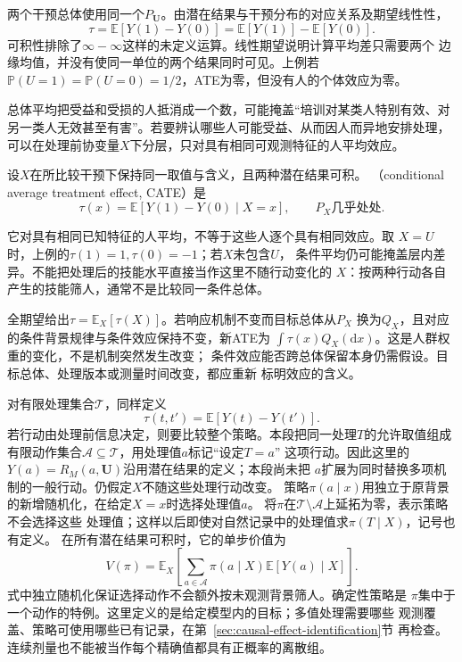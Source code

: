 两个干预总体使用同一个\(P_{\bm U}\)。由潜在结果与干预分布的对应关系及期望线性性，
\begin{equation}
  \tau
  =\mathbb E[Y(1)-Y(0)]
  =\mathbb E[Y(1)]-\mathbb E[Y(0)].
  \label{eq:causal-ate-potential-outcomes}
\end{equation}
可积性排除了\(\infty-\infty\)这样的未定义运算。线性期望说明计算平均差只需要两个
边缘均值，并没有使同一单位的两个结果同时可见。上例若
\(\mathbb P(U=1)=\mathbb P(U=0)=1/2\)，ATE为零，但没有人的个体效应为零。

总体平均把受益和受损的人抵消成一个数，可能掩盖“培训对某类人特别有效、对另一类人无效甚至有害”。若要辨认哪些人可能受益、从而因人而异地安排处理，可以在处理前协变量\(X\)下分层，只对具有相同可观测特征的人平均效应。
\begin{definition}[条件平均处理效应]
  \label{def:causal-conditional-average-effect}
  设\(X\)在所比较干预下保持同一取值与含义，且两种潜在结果可积。
  （conditional average treatment effect, CATE）是
  \begin{equation}
    \tau(x)=\mathbb E[Y(1)-Y(0)\mid X=x],
    \qquad P_X\text{几乎处处}.
    \label{eq:causal-cate}
  \end{equation}
\end{definition}
它对具有相同已知特征的人平均，不等于这些人逐个具有相同效应。取
\(X=U\)时，上例的\(\tau(1)=1,\tau(0)=-1\)；若\(X\)未包含\(U\)，
条件平均仍可能掩盖层内差异。不能把处理后的技能水平直接当作这里不随行动变化的
\(X\)：按两种行动各自产生的技能筛人，通常不是比较同一条件总体。

全期望给出\(\tau=\mathbb E_X[\tau(X)]\)。若响应机制不变而目标总体从\(P_X\)
换为\(Q_X\)，且对应的条件背景规律与条件效应保持不变，新ATE为
\(\int\tau(x)Q_X(\mathrm dx)\)。这是人群权重的变化，不是机制突然发生改变；
条件效应能否跨总体保留本身仍需假设。目标总体、处理版本或测量时间改变，都应重新
标明效应的含义。

对有限处理集合\(\mathcal T\)，同样定义
\[
  \tau(t,t')=\mathbb E[Y(t)-Y(t')].
\]
若行动由处理前信息决定，则要比较整个策略。本段把同一处理\(T\)的允许取值组成
有限动作集合\(\mathcal A\subseteq\mathcal T\)，用处理值\(a\)标记“设定\(T=a\)”
这项行动。因此这里的\(Y(a)=R_M(a,\bm U)\)沿用潜在结果的定义；本段尚未把
\(a\)扩展为同时替换多项机制的一般行动。仍假定\(X\)不随这些处理行动改变。
策略\(\pi(a\mid x)\)用独立于原背景的新增随机化，在给定\(X=x\)时选择处理值\(a\)。
将\(\pi\)在\(\mathcal T\setminus\mathcal A\)上延拓为零，表示策略不会选择这些
处理值；这样以后即使对自然记录中的处理值求\(\pi(T\mid X)\)，记号也有定义。
在所有潜在结果可积时，它的单步价值为
\begin{equation}
  V(\pi)=\mathbb E_X\left[
    \sum_{a\in\mathcal A}\pi(a\mid X)\mathbb E[Y(a)\mid X]
  \right].
  \label{eq:causal-policy-value}
\end{equation}
式中独立随机化保证选择动作不会额外按未观测背景筛人。确定性策略是
\(\pi\)集中于一个动作的特例。这里定义的是给定模型内的目标；多值处理需要哪些
观测覆盖、策略可使用哪些已有记录，在第~\ref{sec:causal-effect-identification}节
再检查。连续剂量也不能被当作每个精确值都具有正概率的离散组。

